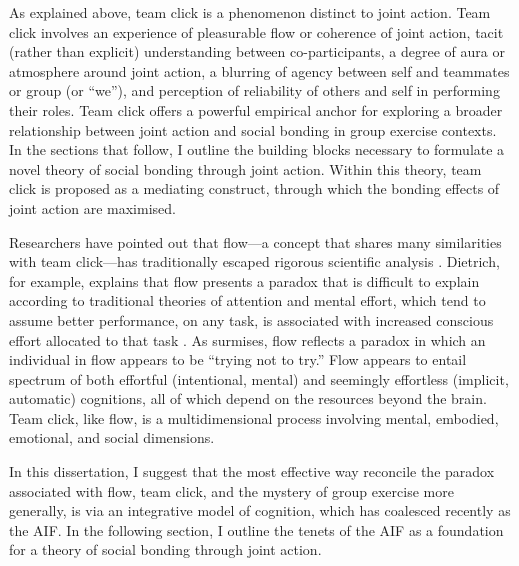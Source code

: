 \begin{CJK}{UTF8}{gbsn}


As explained above, team click is a phenomenon distinct to joint action.  Team click involves an experience of pleasurable flow or coherence of joint action, tacit (rather than explicit) understanding between co-participants, a degree of aura or atmosphere around joint action, a blurring of agency between self and teammates or group (or ``we''), and perception of reliability of others and self in performing their roles.  Team click offers a powerful empirical anchor for exploring a broader relationship between joint action and social bonding in group exercise contexts.  In the sections that follow, I outline the building blocks necessary to formulate a novel theory of social bonding through joint action.  Within this theory, team click is proposed as a mediating construct, through which the bonding effects of joint action are maximised.

Researchers have pointed out that flow---a concept that shares many similarities with team click---has traditionally escaped rigorous scientific analysis \citep{Dietrich2010a,Slingerland2014}.  Dietrich, for example, explains that flow presents a paradox that is difficult to explain according to traditional theories of attention and mental effort, which tend to assume better performance, on any task, is associated with increased conscious effort allocated to that task \citep{Dietrich2004b}.  As \textcite{Slingerland2014} surmises, flow reflects a paradox in which an individual in flow appears to be ``trying not to try.''  Flow appears to entail spectrum of both effortful (intentional, mental) and seemingly effortless (implicit, automatic) cognitions, all of which depend on the resources beyond the brain.  Team click, like flow, is a multidimensional process involving mental, embodied, emotional, and social dimensions.

In this dissertation, I suggest that the most effective way reconcile the paradox associated with flow, team click, and the mystery of group exercise more generally, is via an integrative model of cognition, which has coalesced recently as the AIF. In the following section, I outline the tenets of the AIF as a foundation for a theory of social bonding through joint action.




\end{CJK}
